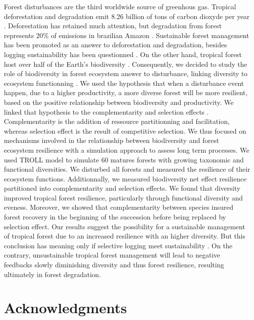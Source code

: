 \documentclass[12pt,]{article}
\let\oldsection\section
\renewcommand\section{\newpage\oldsection}
\theoremstyle{definition}
\theoremstyle{definition}
\theoremstyle{remark}
\begin{document}
Forest disturbances are the third worldwide source of greenhous gas.
Tropical deforestation and degradation emit 8.26 billion of tons of
carbon dioxyde per year \citep{Pearson2017}. Deforestation has retained
much attention, but degradation from forest represents 20\% of emissions
in brazilian Amazon \citep{Asner2005}. Sustainable forest management has
been promoted as an answer to deforestation and degradation, besides
logging sustainability has been questionned \citep{Zimmerman2012}. On
the other hand, tropical forest host over half of the Earth's
biodiversity \citep{Scheffers2012}. Consequently, we decided to study
the role of biodiversity in forest ecosystem answer to disturbance,
linking diversity to ecosystem functionning \citep{Loreau2010}. We used
the hypothesis that when a disturbance event happen, due to a higher
productivity, a more diverse forest will be more resilient, based on the
positive relationship between biodiversity and productivity. We linked
that hypothesis to the complementarity and selection effects
\citep{Loreau2001}. Complementarity is the addition of ressource
partitionning and facilitation, whereas selection effect is the result
of competitive selection. We thus focused on mechanisms involved in the
relationship between biodiversity and forest ecosystem resilience with a
simulation approach to assess long term processes. We used TROLL model
\citep{Li} to simulate 60 matures forests with growing taxonomic and
functional diversities. We disturbed all forests and measured the
resilience of their ecosystem functions. Additionnally, we measured
biodiversity net effect resilience partitioned into complementarity and
selection effects. We found that diversity improved tropical forest
resilience, particularly through functional diversity and eveness.
Moreover, we showed that complementarity between species insured forest
recovery in the beginning of the succession before being replaced by
selection effect. Our results suggest the possibility for a sustainable
management of tropical forest due to an increased resilience with an
higher diversity. But this conclusion has meaning only if selective
logging meet sustainability \citep{Zimmerman2012}. On the contrary,
unsustainable tropical forest management will lead to negative feedbacks
slowly diminishing diversity and thus forest resilience, resulting
ultimately in forest degradation.

\section*{Acknowledgments}\label{acknowledgments}
\end{document}
